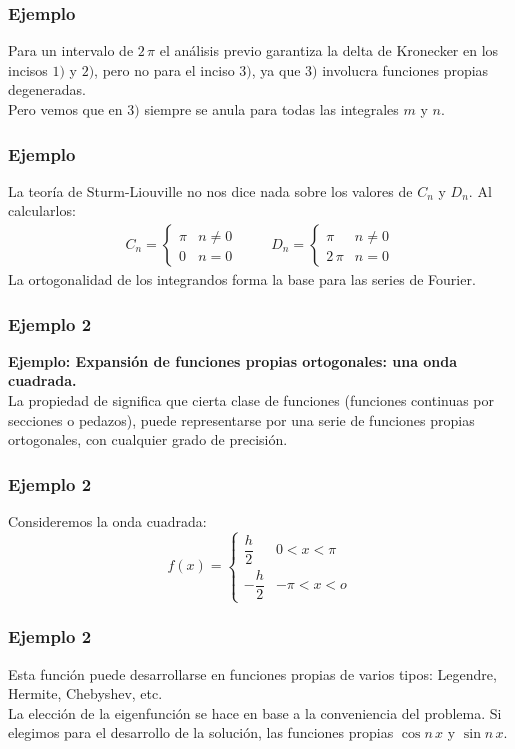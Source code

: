 \documentclass[12pt]{beamer}
\begin{document}
\begin{frame}
\frametitle{Ejemplo}
Para un intervalo de $2 \, \pi$ el análisis previo garantiza la delta de Kronecker en los incisos $1)$ y $2)$, pero no para el inciso $3)$, ya que $3)$ involucra funciones propias degeneradas.
\\
\bigskip
\pause
Pero vemos que en $3)$ siempre se anula para todas las integrales $m$ y $n$.
\end{frame}
\begin{frame}
\frametitle{Ejemplo}
La teoría de Sturm-Liouville no nos dice nada sobre los valores de $C_{n}$ y $D_{n}$. Al calcularlos:
\pause
\begin{align*}
C_{n} = \begin{cases}
\pi  & n \neq 0 \\
0  & n = 0 \end{cases}
\hspace{1cm}
D_{n} = \begin{cases}
\pi & n \neq 0 \\
2 \, \pi & n = 0 \end{cases}
\end{align*}
La ortogonalidad de los integrandos forma la base para las series de Fourier.
\end{frame}
\begin{frame}
\frametitle{Ejemplo 2}
\textbf{Ejemplo: Expansión de funciones propias ortogonales: una onda cuadrada.}
\\
\bigskip
\pause
La propiedad de  significa que cierta clase de funciones (funciones continuas por secciones o pedazos), puede representarse por una serie de funciones propias ortogonales, con cualquier grado de precisión.
\end{frame}
\begin{frame}
\frametitle{Ejemplo 2}
Consideremos la onda cuadrada:
\pause
\begin{equation}
f(x) = \begin{cases}
\dfrac{h}{2} & 0 < x < \pi \\[0.5em]
- \dfrac{h}{2} & -\pi < x < o
\end{cases}
\label{eq_ecuacion_10_37}
\end{equation}
\end{frame}
\begin{frame}
\frametitle{Ejemplo 2}
Esta función puede desarrollarse en funciones propias de varios tipos: Legendre, Hermite, Chebyshev, etc.
\\
\bigskip
\pause
La elección de la eigenfunción se hace en base a la conveniencia del problema. Si elegimos para el desarrollo de la solución, las funciones propias $\cos n \, x$ y $\sin n \, x$.
\end{frame}
\end{document}

